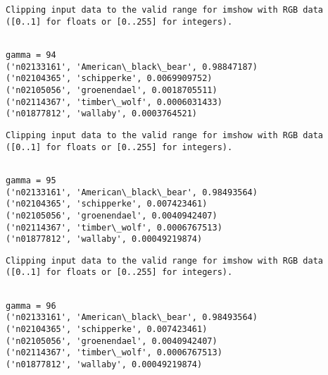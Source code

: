 \documentclass[11pt]{article}
\begin{document}
    \begin{Verbatim}[commandchars=\\\{\}]
Clipping input data to the valid range for imshow with RGB data ([0..1] for floats or [0..255] for integers).

    \end{Verbatim}

    \begin{Verbatim}[commandchars=\\\{\}]

gamma = 94
('n02133161', 'American\_black\_bear', 0.98847187)
('n02104365', 'schipperke', 0.0069909752)
('n02105056', 'groenendael', 0.0018705511)
('n02114367', 'timber\_wolf', 0.0006031433)
('n01877812', 'wallaby', 0.0003764521)

    \end{Verbatim}

    \begin{Verbatim}[commandchars=\\\{\}]
Clipping input data to the valid range for imshow with RGB data ([0..1] for floats or [0..255] for integers).

    \end{Verbatim}

    \begin{Verbatim}[commandchars=\\\{\}]

gamma = 95
('n02133161', 'American\_black\_bear', 0.98493564)
('n02104365', 'schipperke', 0.007423461)
('n02105056', 'groenendael', 0.0040942407)
('n02114367', 'timber\_wolf', 0.0006767513)
('n01877812', 'wallaby', 0.00049219874)

    \end{Verbatim}

    \begin{Verbatim}[commandchars=\\\{\}]
Clipping input data to the valid range for imshow with RGB data ([0..1] for floats or [0..255] for integers).

    \end{Verbatim}

    \begin{Verbatim}[commandchars=\\\{\}]

gamma = 96
('n02133161', 'American\_black\_bear', 0.98493564)
('n02104365', 'schipperke', 0.007423461)
('n02105056', 'groenendael', 0.0040942407)
('n02114367', 'timber\_wolf', 0.0006767513)
('n01877812', 'wallaby', 0.00049219874)

    \end{Verbatim}
\end{document}

